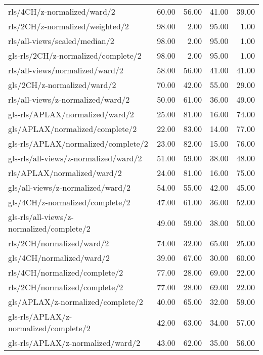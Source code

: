 \begin{longtable}{lrrrr}
    rls/4CH/z-normalized/ward/2               & 60.00 & 56.00 & 41.00 & 39.00 \\
    rls/2CH/z-normalized/weighted/2           & 98.00 &  2.00 & 95.00 &  1.00 \\
    rls/all-views/scaled/median/2             & 98.00 &  2.00 & 95.00 &  1.00 \\
    gls-rls/2CH/z-normalized/complete/2       & 98.00 &  2.00 & 95.00 &  1.00 \\
    rls/all-views/normalized/ward/2           & 58.00 & 56.00 & 41.00 & 41.00 \\
    gls/2CH/z-normalized/ward/2               & 70.00 & 42.00 & 55.00 & 29.00 \\
    rls/all-views/z-normalized/ward/2         & 50.00 & 61.00 & 36.00 & 49.00 \\
    gls-rls/APLAX/normalized/ward/2           & 25.00 & 81.00 & 16.00 & 74.00 \\
    gls/APLAX/normalized/complete/2           & 22.00 & 83.00 & 14.00 & 77.00 \\
    gls-rls/APLAX/normalized/complete/2       & 23.00 & 82.00 & 15.00 & 76.00 \\
    gls-rls/all-views/z-normalized/ward/2     & 51.00 & 59.00 & 38.00 & 48.00 \\
    rls/APLAX/normalized/ward/2               & 24.00 & 81.00 & 16.00 & 75.00 \\
    gls/all-views/z-normalized/ward/2         & 54.00 & 55.00 & 42.00 & 45.00 \\
    gls/4CH/z-normalized/complete/2           & 47.00 & 61.00 & 36.00 & 52.00 \\
    gls-rls/all-views/z-normalized/complete/2 & 49.00 & 59.00 & 38.00 & 50.00 \\
    rls/2CH/normalized/ward/2                 & 74.00 & 32.00 & 65.00 & 25.00 \\
    gls/4CH/normalized/ward/2                 & 39.00 & 67.00 & 30.00 & 60.00 \\
    rls/4CH/normalized/complete/2             & 77.00 & 28.00 & 69.00 & 22.00 \\
    rls/2CH/normalized/complete/2             & 77.00 & 28.00 & 69.00 & 22.00 \\
    gls/APLAX/z-normalized/complete/2         & 40.00 & 65.00 & 32.00 & 59.00 \\
    gls-rls/APLAX/z-normalized/complete/2     & 42.00 & 63.00 & 34.00 & 57.00 \\
    gls-rls/APLAX/z-normalized/ward/2         & 43.00 & 62.00 & 35.00 & 56.00 \\

\end{longtable}
